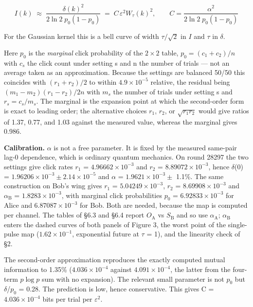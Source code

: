 \documentclass[
  11pt,
]{article}
\begin{document}
\begin{equation}
I(k) \;\approx\; \frac{\delta(k)^2}{2\ln 2\; p_0(1-p_0)} \;=\; C\,\varepsilon^2 W_\tau(k)^2, \qquad C = \frac{\alpha^2}{2\ln 2\; p_0(1-p_0)}
\label{eq:mi}
\end{equation}

For the Gaussian kernel this is a bell curve of width \(\tau/\sqrt2\) in
\(I\) and \(\tau\) in \(\delta\).

Here \(p_{0}\) is the \emph{marginal} click probability of the
\(2\times2\) table, \(p_0=(c_1+c_2)/n\) with \(c_s\) the click count
under setting s and n the number of trials --- not an average taken as
an approximation. Because the settings are balanced 50/50 this coincides
with \((r_1+r_2)/2\) to within \(4.9 \times 10^{-5}\) relative, the
residual being \((m_1-m_2)(r_1-r_2)/2n\) with \(m_s\) the number of
trials under setting s and \(r_s = c_s/m_s\). The marginal is the
expansion point at which the second-order form is exact to leading
order; the alternative choices \(r_{1}\), \(r_{2}\), or
\(\sqrt{r_1r_2}\) would give ratios of 1.37, 0.77, and 1.03 against the
measured value, whereas the marginal gives 0.986.

\textbf{Calibration.} \(\alpha\) is not a free parameter. It is fixed by
the measured same-pair lag-0 dependence, which is ordinary quantum
mechanics. On round 28297 the two settings give click rates \(r_{1}\) =
\(4.96662 \times 10^{-3}\) and \(r_{2}\) = \(8.89072 \times 10^{-3}\),
hence \(\delta\)(0) = \(1.96206 \times 10^{-3} \pm 2.14 \times 10^{-5}\)
and \(\alpha\) = \(1.9621 \times 10^{-3} \pm\) 1.1\%. The same
construction on Bob's wing gives \(r_{1}\) = \(5.04249 \times 10^{-3}\),
\(r_{2}\) = \(8.69908 \times 10^{-3}\) and \(\alpha_{\mathrm{B}}\) =
\(1.8283 \times 10^{-3}\), with marginal click probabilities \(p_{0}\) =
\(6.92833 \times 10^{-3}\) for Alice and \(6.87087 \times 10^{-3}\) for
Bob. Both are needed, because the map is computed per channel. The
tables of \S6.3 and \S6.4 report \(O_{\mathrm{A}}\) vs
\(S_{\mathrm{B}}\) and so use \(\alpha_{\mathrm{A}}\);
\(\alpha_{\mathrm{B}}\) enters the dashed curves of both panels of
Figure 3, the worst point of the single-pulse map
(\(1.62 \times 10^{-1}\), exponential future at \(\tau\) = 1), and the
linearity check of \S2.

The second-order approximation reproduces the exactly computed mutual
information to 1.35\% (\(4.036 \times 10^{-4}\) against
\(4.091 \times 10^{-4}\), the latter from the four-term \(p\log p\) sum
with no expansion). The relevant small parameter is not \(p_{0}\) but
\(\delta\)/\(p_{0}\) = 0.28. The prediction is low, hence conservative.
This gives C = \(4.036 \times 10^{-4}\) bits per trial per
\(\varepsilon^{2}\).
\end{document}
